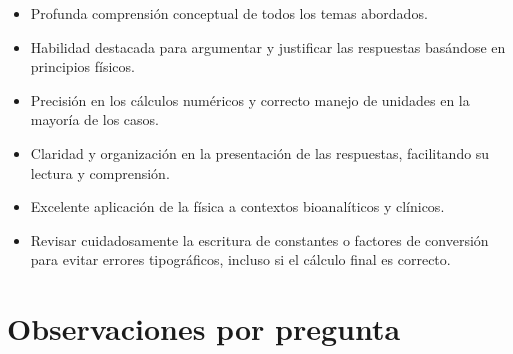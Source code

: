 \documentclass[11pt,a4paper]{article}
\begin{document}
\vspace{4pt}
\begin{minipage}[t]{0.48\linewidth}
  \begin{tcolorbox}[cajaFortaleza, title={Fortalezas}]
\begin{itemize}[leftmargin=1.5em, itemsep=2pt]
  \item Profunda comprensión conceptual de todos los temas abordados.
  \item Habilidad destacada para argumentar y justificar las respuestas basándose en principios físicos.
  \item Precisión en los cálculos numéricos y correcto manejo de unidades en la mayoría de los casos.
  \item Claridad y organización en la presentación de las respuestas, facilitando su lectura y comprensión.
  \item Excelente aplicación de la física a contextos bioanalíticos y clínicos.
\end{itemize}
  \end{tcolorbox}
\end{minipage}
\hfill
\begin{minipage}[t]{0.48\linewidth}
  \begin{tcolorbox}[cajaMejora, title={Areas de mejora}]
\begin{itemize}[leftmargin=1.5em, itemsep=2pt]
  \item Revisar cuidadosamente la escritura de constantes o factores de conversión para evitar errores tipográficos, incluso si el cálculo final es correcto.
\end{itemize}
  \end{tcolorbox}
\end{minipage}

\section*{Observaciones por pregunta}
\end{document}
